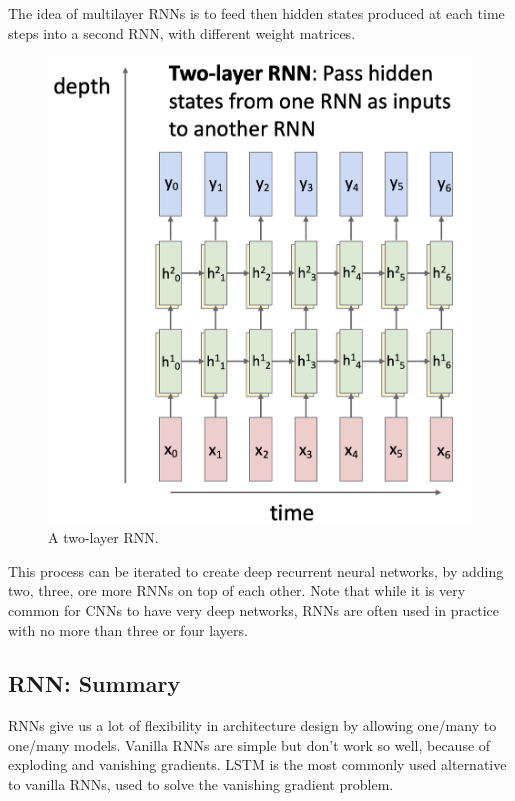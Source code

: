 The idea of multilayer RNNs is to feed then hidden states produced at each time steps into a second RNN, with different weight matrices.
\begin{figure}[H]
    \centering
    \includegraphics[width=.5\textwidth]{images/two-layer-rnn.png}
    \caption{A two-layer RNN.}
\end{figure}
This process can be iterated to create deep recurrent neural networks, by adding two, three, ore more RNNs on top of each other. Note that while it is very common for CNNs to have very deep networks, RNNs are often used in practice with no more than three or four layers.

\subsection*{RNN: Summary}
RNNs give us a lot of flexibility in architecture design by allowing one/many to one/many models. Vanilla RNNs are simple but don't work so well, because of exploding and vanishing gradients. LSTM is the most commonly used alternative to vanilla RNNs, used to solve the vanishing gradient problem.


\newpage